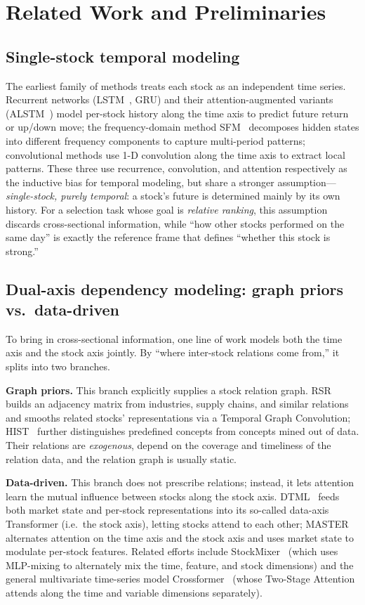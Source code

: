 \documentclass[a4paper,11pt]{article}
\begin{document}
\section{Related Work and Preliminaries}\label{sec:related}

\subsection{Single-stock temporal modeling}\label{sec:rw-seq}
The earliest family of methods treats each stock as an independent time series.
Recurrent networks (LSTM~\cite{lstm}, GRU) and their attention-augmented
variants (ALSTM~\cite{alstm}) model per-stock history along the time axis to
predict future return or up/down move; the frequency-domain method
SFM~\cite{sfm} decomposes hidden states into different frequency components to
capture multi-period patterns; convolutional methods use 1-D convolution along
the time axis to extract local patterns. These three use recurrence,
convolution, and attention respectively as the inductive bias for temporal
modeling, but share a stronger assumption---\emph{single-stock, purely
temporal}: a stock's future is determined mainly by its own history. For a
selection task whose goal is \emph{relative ranking}, this assumption discards
cross-sectional information, while ``how other stocks performed on the same
day'' is exactly the reference frame that defines ``whether this stock is
strong.''

\subsection{Dual-axis dependency modeling: graph priors vs.\ data-driven}\label{sec:rw-dual}
To bring in cross-sectional information, one line of work models both the time
axis and the stock axis jointly. By ``where inter-stock relations come from,''
it splits into two branches.

\textbf{Graph priors.} This branch explicitly supplies a stock relation
graph. RSR~\cite{rsr} builds an adjacency matrix from industries, supply
chains, and similar relations and smooths related stocks' representations via a
Temporal Graph Convolution; HIST~\cite{hist} further distinguishes predefined
concepts from concepts mined out of data. Their relations are \emph{exogenous},
depend on the coverage and timeliness of the relation data, and the relation
graph is usually static.

\textbf{Data-driven.} This branch does not prescribe relations; instead,
it lets attention learn the mutual influence between stocks along the stock
axis. DTML~\cite{dtml} feeds both market state and per-stock representations
into its so-called data-axis Transformer (i.e.\ the stock axis), letting stocks
attend to each other; MASTER~\cite{master} alternates attention on the time axis
and the stock axis and uses market state to modulate per-stock features.
Related efforts include StockMixer~\cite{stockmixer} (which uses MLP-mixing to
alternately mix the time, feature, and stock dimensions) and the general
multivariate time-series model Crossformer~\cite{crossformer} (whose
Two-Stage Attention attends along the time and variable dimensions separately).
\end{document}
